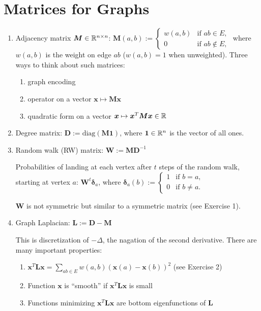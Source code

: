 \documentclass[11pt,letterpaper]{article}
\begin{document}
\section{Matrices for Graphs}

\begin{enumerate}[label=(\alph*)]
  \item Adjacency matrix $\bm{M} \in \mathbb{R}^{n \times n}$: $\bm{M}(a,b) := \begin{cases}
    w(a,b) & \text{if } ab \in E,\\
    0 & \text{if } ab \notin E,
  \end{cases}$
  where $w(a,b)$ is the weight on edge $ab$ ($w(a,b)=1$ when unweighted).
  Three ways to think about such matrices:

  \begin{enumerate}[label=(\arabic*)]
    \item graph encoding
    \item operator on a vector $\bm{x} \mapsto \bm{M}\bm{x}$
    \item quadratic form on a vector $\bm{x} \mapsto \bm{x}^T \bm{M} \bm{x} \in \mathbb{R}$
  \end{enumerate}

  \item Degree matrix: $\bm{D} := \text{diag}(\bm{M}\bm{1})$,
  where $\bm{1} \in \mathbb{R}^n$ is the vector of all ones.

  \item Random walk (RW) matrix: $\bm{W} := \bm{M}\bm{D}^{-1}$
  
  Probabilities of landing at each vertex after $t$ steps of the random walk, starting at vertex $a$:
  $\bm{W}^t\bm{\delta}_a$,
  where $\bm{\delta}_a(b) := \begin{cases}
    1 & \text{if }b=a,\\
    0 & \text{if }b \neq a.
  \end{cases}$

  \begin{remark}
    $\bm{W}$ is not symmetric but similar to a symmetric matrix  (see Exercise 1).
  \end{remark}

  \item Graph Laplacian: $\bm{L} := \bm{D} - \bm{M}$

  This is discretization of $-\Delta$, the nagation of the second derivative.
  There are many important properties:

  \begin{enumerate}[label=(\arabic*)]
    \item $\bm{x}^T\bm{L}\bm{x} = \sum_{ab \in E} w(a,b)(\bm{x}(a) - \bm{x}(b))^2$ (see Exercise 2)
    \item Function $\bm{x}$ is ``smooth'' if $\bm{x}^T\bm{L}\bm{x}$ is small
    \item Functions minimizing $\bm{x}^T\bm{L}\bm{x}$ are bottom eigenfunctions of $\bm{L}$


\end{enumerate}
\end{enumerate}
\end{document}
